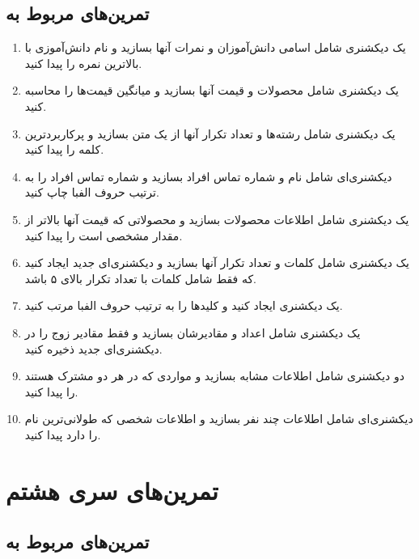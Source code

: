 \documentclass[b5paper,12pt]{article}
\begin{document}
	\subsection*{تمرین‌های مربوط به }
	
	\begin{enumerate}
		\item یک دیکشنری شامل اسامی دانش‌آموزان و نمرات آنها بسازید و نام دانش‌آموزی با بالاترین نمره را پیدا کنید.
		\item یک دیکشنری شامل محصولات و قیمت آنها بسازید و میانگین قیمت‌ها را محاسبه کنید.
		\item یک دیکشنری شامل رشته‌ها و تعداد تکرار آنها از یک متن بسازید و پرکاربردترین کلمه را پیدا کنید.
		\item دیکشنری‌ای شامل نام و شماره تماس افراد بسازید و شماره تماس افراد را به ترتیب حروف الفبا چاپ کنید.
		\item یک دیکشنری شامل اطلاعات محصولات بسازید و محصولاتی که قیمت آنها بالاتر از مقدار مشخصی است را پیدا کنید.
		\item یک دیکشنری شامل کلمات و تعداد تکرار آنها بسازید و دیکشنری‌ای جدید ایجاد کنید که فقط شامل کلمات با تعداد تکرار بالای ۵ باشد.
		\item یک دیکشنری ایجاد کنید و کلیدها را به ترتیب حروف الفبا مرتب کنید.
		\item یک دیکشنری شامل اعداد و مقادیرشان بسازید و فقط مقادیر زوج را در دیکشنری‌ای جدید ذخیره کنید.
		\item دو دیکشنری شامل اطلاعات مشابه بسازید و مواردی که در هر دو مشترک هستند را پیدا کنید.
		\item دیکشنری‌ای شامل اطلاعات چند نفر بسازید و اطلاعات شخصی که طولانی‌ترین نام را دارد پیدا کنید.
	\end{enumerate}
	
	
	
	\newpage
	\section*{تمرین‌های سری هشتم}
	
	\subsection*{تمرین‌های مربوط به }
	
\end{document}
